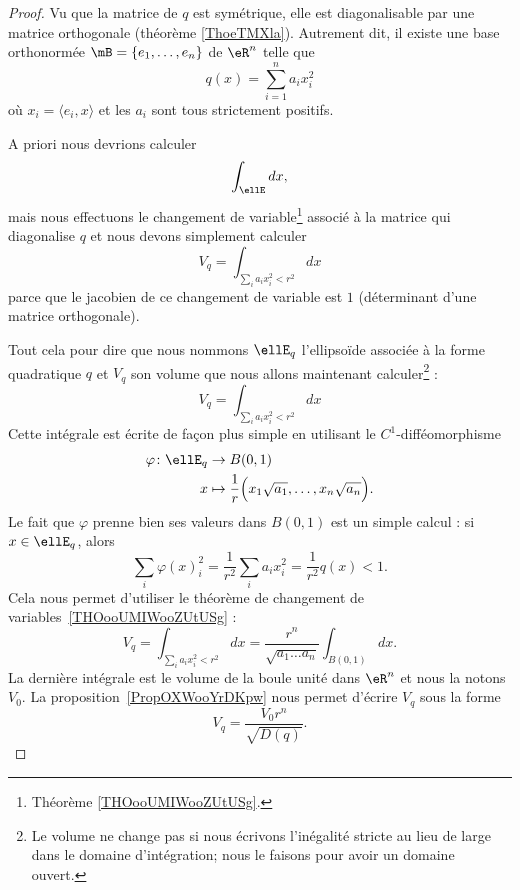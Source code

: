 \begin{proof}
    Vu que la matrice de \( q\) est symétrique, elle est diagonalisable par une matrice orthogonale (théorème \ref{ThoeTMXla}). Autrement dit, il existe une base orthonormée \( \mB=\{ e_1,\ldots, e_n \}\) de \( \eR^n\) telle que
    \begin{equation}    \label{EqELBooQLPQUj}
        q(x)=\sum_{i=1}^na_ix_i^2
    \end{equation}
    où \( x_i=\langle e_i, x\rangle \) et les \( a_i\) sont tous strictement positifs. 

    A priori nous devrions calculer
    \begin{equation}
        \int_{\ellE}dx,
    \end{equation}
    mais nous effectuons le changement de variable\footnote{Théorème \ref{THOooUMIWooZUtUSg}.} associé à la matrice qui diagonalise \( q\) et nous devons simplement calculer
    \begin{equation}
        V_q=\int_{\sum_ia_ix_i^2<r^2}dx
    \end{equation}
    parce que le jacobien de ce changement de variable est \( 1\) (déterminant d'une matrice orthogonale).

    Tout cela pour dire que nous nommons \( \ellE_q\) l'ellipsoïde associée à la forme quadratique \( q\) et \( V_q\) son volume que nous allons maintenant calculer\footnote{Le volume ne change pas si nous écrivons l'inégalité stricte au lieu de large dans le domaine d'intégration; nous le faisons pour avoir un domaine ouvert.} :
    \begin{equation}
        V_q=\int_{\sum_ia_ix_i^2<r^2}dx
    \end{equation}
    Cette intégrale est écrite de façon plus simple en utilisant le \( C^1\)-difféomorphisme
    \begin{equation}
        \begin{aligned}
            \varphi\colon \ellE_q&\to B(0,1) \\
            x&\mapsto \frac{1}{  r }\Big( x_1\sqrt{a_1},\ldots, x_n\sqrt{a_n} \Big).
        \end{aligned}
    \end{equation}
    Le fait que \( \varphi\) prenne bien ses valeurs dans \( B(0,1)\) est un simple calcul : si \( x\in\ellE_q\), alors
    \begin{equation}
        \sum_i\varphi(x)_i^2=\frac{1}{ r^2 }\sum_ia_ix_i^2=\frac{1}{ r^2 }q(x)<1.
    \end{equation}
    Cela nous permet d'utiliser le théorème de changement de variables~\ref{THOooUMIWooZUtUSg} :
    \begin{equation}
        V_q=\int_{\sum_ia_ix_i^2<r^2}dx=\frac{r^n}{ \sqrt{a_1\ldots a_n} }\int_{B(0,1)}dx.
    \end{equation}
    La dernière intégrale est le volume de la boule unité dans \( \eR^n\) et nous la notons \( V_0\). La proposition~\ref{PropOXWooYrDKpw} nous permet d'écrire \(V_q\) sous la forme
    \begin{equation}
        V_q=\frac{ V_0 r^n}{ \sqrt{D(q)} }.
    \end{equation}
\end{proof}

